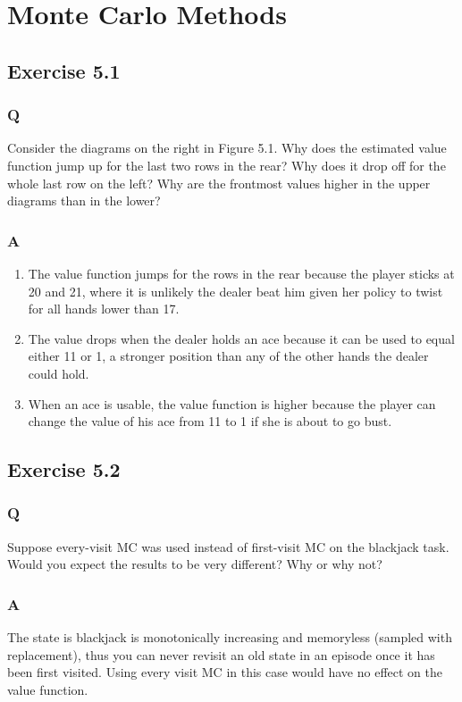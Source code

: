 \section{Monte Carlo Methods}

\subsection{Exercise 5.1}
\subsubsection{Q}
Consider the diagrams on the right in Figure 5.1. Why does the estimated value function jump up for the last two rows in the rear? Why does it drop off for the whole last row on the left? Why are the frontmost values higher in the upper diagrams than in the lower?
\subsubsection{A}
\begin{enumerate}
	\item The value function jumps for the rows in the rear because the player sticks at 20 and 21, where it is unlikely the dealer beat him given her policy to twist for all hands lower than 17.
	\item The value drops when the dealer holds an ace because it can be used to equal either 11 or 1, a stronger position than any of the other hands the dealer could hold.
	\item When an ace is usable, the value function is higher because the player can change the value of his ace from 11 to 1 if she is about to go bust.
\end{enumerate}

\subsection{Exercise 5.2}
\subsubsection{Q}
Suppose every-visit MC was used instead of first-visit MC on the blackjack task. Would you expect the results to be very different? Why or why not?
\subsubsection{A}
The state is blackjack is monotonically increasing and memoryless (sampled with replacement), thus you can never revisit an old state in an episode once it has been first visited. Using every visit MC in this case would have no effect on the value function.

